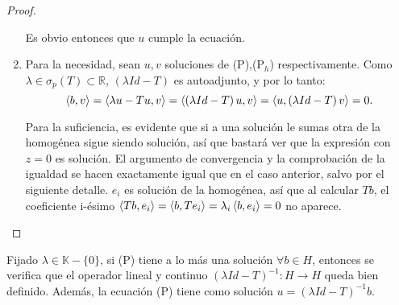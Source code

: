 \begin{proof}
\begin{enumerate}
      Es obvio entonces que $u$ cumple la ecuación.

    \item Para la necesidad, sean $u,v$ soluciones de (P),(P$_h$)
      respectivamente. Como $\lambda\in \sigma_p(T)\subset \mathbb{R}$, $(\lambda
      Id-T)$ es autoadjunto, y por lo tanto:
      \[
      \left\langle b,v\right\rangle=
      \left\langle\lambda u - Tu,v\right\rangle=
      \left\langle\left( \lambda Id - T \right) u,v\right\rangle=
      \left\langle u,\left( \lambda Id - T \right) v\right\rangle=
      0
      .\] 

      Para la suficiencia, es evidente que si a una solución le sumas otra de la
      homogénea sigue siendo solución, así que bastará ver que la expresión con
      $z=0$ es solución. El argumento de convergencia y la comprobación de la
      igualdad se hacen exactamente igual que en el caso anterior, salvo por el
      siguiente detalle. $e_i$ es solución de la homogénea, así que al calcular
      $Tb$, el coeficiente i-ésimo
      $\left\langle Tb,e_i\right\rangle=\left\langle b,Te_i\right\rangle=\lambda_i\left\langle b,e_i\right\rangle=0$ no aparece.
  \end{enumerate}
\end{proof}

\begin{corollary}
  Fijado $\lambda\in \mathbb{K}-\{0\}$, si (P) tiene a lo más una solución
  $\forall  b\in H$, entonces se verifica que el operador lineal y continuo
  $(\lambda Id-T)^{-1}:H\to H$ queda bien definido. Además, la ecuación (P)
  tiene como solución $u=(\lambda Id-T)^{-1} b$.
\end{corollary}
